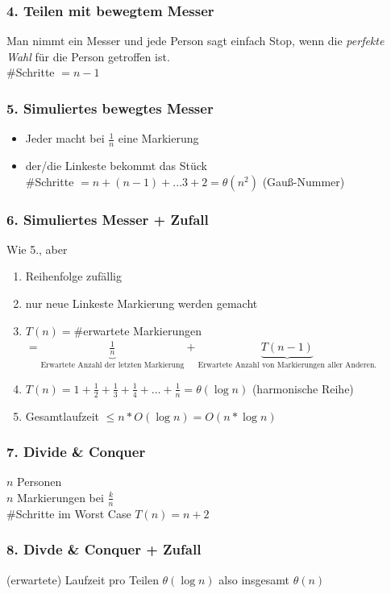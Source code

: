 \subsubsection{4. Teilen mit bewegtem Messer}
Man nimmt ein Messer und jede Person sagt einfach Stop, wenn die \emph{perfekte Wahl} für die Person getroffen ist.\\
$\#$Schritte $= n-1$
\subsubsection{5. Simuliertes bewegtes Messer}
\begin{itemize}
	\item Jeder macht bei $\frac{1}{n}$ eine Markierung
	\item der/die Linkeste bekommt das Stück\\$\#$Schritte $=n+(n-1)+...3+2=\theta(n^2)$ (Gauß-Nummer)
\end{itemize}
\subsubsection{6. Simuliertes Messer + Zufall}
Wie 5., aber
\begin{enumerate}
	\item Reihenfolge zufällig
	\item nur neue Linkeste Markierung werden gemacht
	\item $T(n) = \#$erwartete Markierungen\\
	$= \underbrace{\frac{1}{n}}_{\text{Erwartete Anzahl der letzten Markierung}} + \underbrace{T(n-1)}_{\text{Erwartete Anzahl von Markierungen aller Anderen.}}$
	\item $T(n)=1+\frac{1}{2}+\frac{1}{3}+\frac{1}{4}+\dots+\frac{1}{n} = \theta(\log n)$ (harmonische Reihe)
	\item Gesamtlaufzeit $\leq n * O(\log n) = O(n * \log n)$
\end{enumerate}
\subsubsection{7. Divide \& Conquer}
$n$ Personen\\
$n$ Markierungen bei $\frac{k}{n}$\\
$\#$Schritte im Worst Case $T(n) = n +2$

\subsubsection{8. Divde \& Conquer + Zufall}
(erwartete) Laufzeit pro Teilen $\theta (\log n)$ also insgesamt $\theta(n)$
